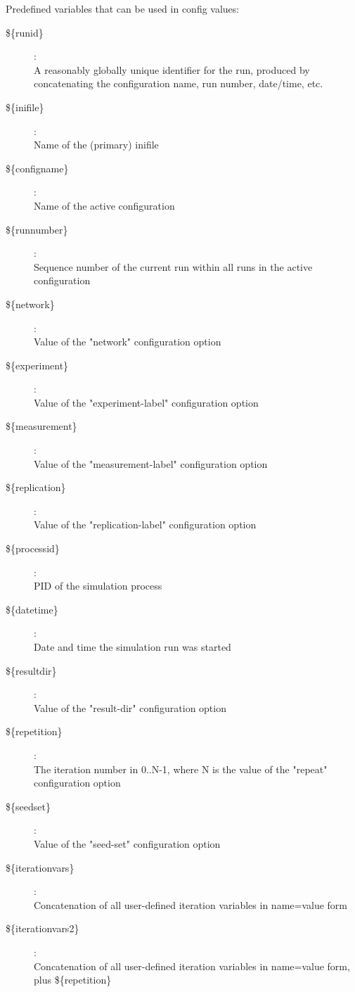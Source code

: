 Predefined variables that can be used in config values:

\begin{description}
\item[\$\{runid\}] : \\
    A reasonably globally unique identifier for the run, produced by
    concatenating the configuration name, run number, date/time, etc.
\item[\$\{inifile\}] : \\
    Name of the (primary) inifile
\item[\$\{configname\}] : \\
    Name of the active configuration
\item[\$\{runnumber\}] : \\
    Sequence number of the current run within all runs in the active
    configuration
\item[\$\{network\}] : \\
    Value of the "network" configuration option
\item[\$\{experiment\}] : \\
    Value of the "experiment-label" configuration option
\item[\$\{measurement\}] : \\
    Value of the "measurement-label" configuration option
\item[\$\{replication\}] : \\
    Value of the "replication-label" configuration option
\item[\$\{processid\}] : \\
    PID of the simulation process
\item[\$\{datetime\}] : \\
    Date and time the simulation run was started
\item[\$\{resultdir\}] : \\
    Value of the "result-dir" configuration option
\item[\$\{repetition\}] : \\
    The iteration number in 0..N-1, where N is the value of the "repeat"
    configuration option
\item[\$\{seedset\}] : \\
    Value of the "seed-set" configuration option
\item[\$\{iterationvars\}] : \\
    Concatenation of all user-defined iteration variables in name=value form
\item[\$\{iterationvars2\}] : \\
    Concatenation of all user-defined iteration variables in name=value form,
    plus \$\{repetition\}
\end{description}

